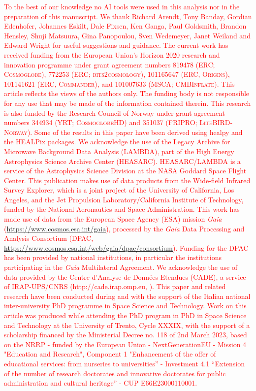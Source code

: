 \documentclass{aa}
\newcommand{\edit}[1]{\textcolor{red}{#1}}
\begin{document}
\begin{acknowledgements}
    \edit{
        To the best of our knowledge no AI tools were used in this analysis nor in the preparation of this manuscript.
  We thank Richard Arendt, Tony Banday, Gordian Edenhofer, Johannes Eskilt, Dale Fixsen, Ken Ganga, Paul
  Goldsmith, Brandon Hensley, Shuji Matsuura, Gina Panopoulou, Sven Wedemeyer, Janet Weiland and Edward Wright for
  useful suggestions and guidance.  The current work has received
  funding from the European Union’s Horizon 2020 research and
  innovation programme under grant agreement numbers 819478 (ERC;
  \textsc{Cosmoglobe}), 772253 (ERC; \textsc{bits2cosmology}),
  101165647 (ERC, \textsc{Origins}), 101141621 (ERC,
  \textsc{Commander}), and 101007633 (MSCA; \textsc{CMBInflate}).
  This article reflects the views of the authors only. The funding
  body is not responsible for any use that may be made of the
  information contained therein. This research is
  also funded by the Research Council of Norway under grant agreement
  numbers 344934 (YRT; \textsc{CosmoglobeHD}) and 351037 (FRIPRO;
  \textsc{LiteBIRD-Norway}). Some of the results in this paper have been
  derived using healpy \citep{Zonca2019} and the HEALPix
  \citep{healpix} packages.  We acknowledge the use of the Legacy
  Archive for Microwave Background Data Analysis (LAMBDA), part of the
  High Energy Astrophysics Science Archive Center
  (HEASARC). HEASARC/LAMBDA is a service of the Astrophysics Science
  Division at the NASA Goddard Space Flight Center. This publication
  makes use of data products from the Wide-field Infrared Survey
  Explorer, which is a joint project of the University of California,
  Los Angeles, and the Jet Propulsion Laboratory/California Institute
  of Technology, funded by the National Aeronautics and Space
  Administration. This work has made use of data from the European
  Space Agency (ESA) mission {\it Gaia}
  (\url{https://www.cosmos.esa.int/gaia}), processed by the {\it Gaia}
  Data Processing and Analysis Consortium (DPAC,
  \url{https://www.cosmos.esa.int/web/gaia/dpac/consortium}). Funding
  for the DPAC has been provided by national institutions, in
  particular the institutions participating in the {\it Gaia}
  Multilateral Agreement.  We acknowledge the use of data provided by
  the Centre d'Analyse de Données Etendues (CADE), a service of
  IRAP-UPS/CNRS (http://cade.irap.omp.eu, \citealt{paradis:2012}).  
  This paper and related research have been conducted during and with the support of the Italian national inter-university PhD programme in Space Science and Technology. Work on this article was produced while attending the PhD program in PhD in Space Science and Technology at the University of Trento, Cycle XXXIX, with the support of a scholarship financed by the Ministerial Decree no. 118 of 2nd March 2023, based on the NRRP - funded by the European Union - NextGenerationEU - Mission 4 "Education and Research", Component 1 "Enhancement of the offer of educational services: from nurseries to universities” - Investment 4.1 “Extension of the number of research doctorates and innovative doctorates for public administration and cultural heritage” - CUP E66E23000110001.
    }
\end{acknowledgements}
\end{document}

